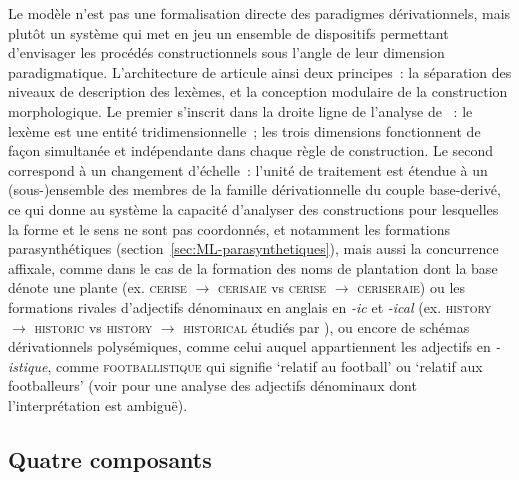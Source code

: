 \documentclass[output=paper]{langsci/langscibook}
\begin{document}
Le modèle \paradis{} n'est pas une formalisation directe des paradigmes dérivationnels, mais plutôt un système qui met en jeu un ensemble de dispositifs permettant d'envisager les procédés constructionnels sous l'angle de leur dimension paradigmatique.
%
L'architecture de \paradis{} articule ainsi  deux principes~: la séparation des niveaux de description des lexèmes, et la conception modulaire de la construction morphologique. Le premier s'inscrit dans la droite ligne de l'analyse de \cite{Fradin03} ~: le lexème est une entité tridimensionnelle~; les trois dimensions fonctionnent de façon simultanée et indépendante dans chaque règle de construction.
%
Le second correspond à un changement d'échelle~: l'unité de traitement est étendue à un (sous-)ensemble des   membres de la famille dérivationnelle du couple base-derivé, ce qui donne au système la capacité d'analyser des constructions pour lesquelles la forme et le sens ne sont pas coordonnés, et notamment les  formations parasynthétiques (section~\ref{sec:ML-parasynthetiques}), mais aussi la concurrence affixale, comme dans le cas de la formation des noms de plantation dont la base dénote une plante (ex. \textsc{cerise} $\rightarrow$ \textsc{cerisaie} vs  \textsc{cerise} $\rightarrow$ \textsc{ceriseraie}) ou les formations rivales d'adjectifs dénominaux en anglais en \emph{\mbox{-ic}} et \emph{\mbox{-ical}} (ex. \textsc{history}  $\rightarrow$ \textsc{historic} vs \textsc{history}  $\rightarrow$ \textsc{historical} étudiés par \citet{Lindsay2013}), ou encore de schémas dérivationnels polysémiques, comme celui auquel appartiennent les adjectifs en \emph{\mbox{-istique}},  comme \textsc{footballistique} qui signifie `relatif au football' ou `relatif aux footballeurs' (voir \citet{strnadova2015.decembrettes} pour une analyse des adjectifs dénominaux dont l'interprétation est ambiguë).

\subsection{Quatre composants}
\label{sec:quatre-composants}
\end{document}
